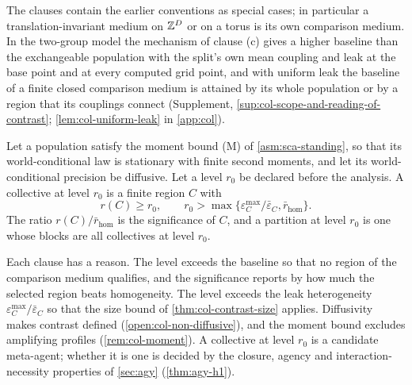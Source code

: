 The clauses contain the earlier conventions as special cases; in particular a translation-invariant medium on $\mathbb{Z}^D$ or on a torus is its own comparison medium. In the two-group model the mechanism of clause (c) gives a higher baseline than the exchangeable population with the split's own mean coupling and leak at the base point and at every computed grid point, and with uniform leak the baseline of a finite closed comparison medium is attained by its whole population or by a region that its couplings connect (Supplement, \cref{sup:col-scope-and-reading-of-contrast}; \cref{lem:col-uniform-leak} in \cref{app:col}).

\begin{definition}[Collective]\label{def:col-collective}
Let a population satisfy the moment bound (M) of \cref{asm:sca-standing}, so that its world-conditional law is stationary with finite second moments, and let its world-conditional precision be diffusive. Let a level $r_0$ be declared before the analysis. A collective at level $r_0$ is a finite region $C$ with
\begin{equation}\label{eq:col-collective}
r(C)\ge r_0,\qquad r_0>\max\{\varepsilon^{\max}_C/\bar\varepsilon_C,\bar r_{\mathrm{hom}}\}.
\end{equation}
The ratio $r(C)/\bar r_{\mathrm{hom}}$ is the significance of $C$, and a partition at level $r_0$ is one whose blocks are all collectives at level $r_0$.
\end{definition}

Each clause has a reason. The level exceeds the baseline so that no region of the comparison medium qualifies, and the significance reports by how much the selected region beats homogeneity. The level exceeds the leak heterogeneity $\varepsilon^{\max}_C/\bar\varepsilon_C$ so that the size bound of \cref{thm:col-contrast-size} applies. Diffusivity makes contrast defined (\cref{open:col-non-diffusive}), and the moment bound excludes amplifying profiles (\cref{rem:col-moment}). A collective at level $r_0$ is a candidate meta-agent; whether it is one is decided by the closure, agency and interaction-necessity properties of \cref{sec:agy} (\cref{thm:agy-h1}).

